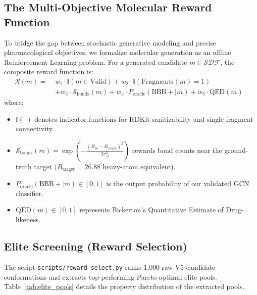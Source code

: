 \documentclass[11pt, a4paper]{article}
\begin{document}
\subsection{The Multi-Objective Molecular Reward Function}
To bridge the gap between stochastic generative modeling and precise pharmacological objectives, we formalize molecular generation as an offline Reinforcement Learning problem. For a generated candidate $m \in \mathcal{SDF}$, the composite reward function is:
\begin{equation}
\begin{aligned}
\mathcal{R}(m) = \; & w_1 \cdot \mathbb{I}(m \in \text{Valid}) + w_2 \cdot \mathbb{I}(\text{Fragments}(m) = 1) \\
& + w_3 \cdot \mathcal{S}_{\text{bonds}}(m) + w_4 \cdot P_{\text{oracle}}(\text{BBB}+ \mid m) + w_5 \cdot \text{QED}(m)
\end{aligned}
\end{equation}
where:
\begin{itemize}[noitemsep]
    \item $\mathbb{I}(\cdot)$ denotes indicator functions for RDKit sanitizability and single-fragment connectivity.
    \item $\mathcal{S}_{\text{bonds}}(m) = \exp\left( -\frac{(B_m - B_{\text{target}})^2}{2\sigma_B^2} \right)$ rewards bond counts near the ground-truth target ($B_{\text{target}} = 26.88$ heavy-atom equivalent).
    \item $P_{\text{oracle}}(\text{BBB}+ \mid m) \in [0, 1]$ is the output probability of our validated GCN classifier.
    \item $\text{QED}(m) \in [0, 1]$ represents Bickerton's Quantitative Estimate of Drug-likeness.
\end{itemize}

\subsection{Elite Screening (Reward Selection)}
The script \texttt{scripts/reward\_select.py} ranks 1,000 raw V5 candidate conformations and extracts top-performing Pareto-optimal elite pools. Table~\ref{tab:elite_pools} details the property distribution of the extracted pools.
\end{document}
